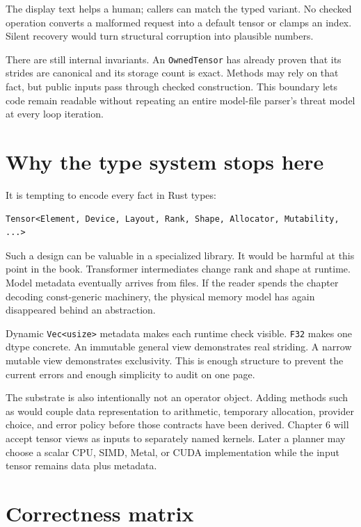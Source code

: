 The display text helps a human; callers can match the typed variant. No
checked operation converts a malformed request into a default tensor or
clamps an index. Silent recovery would turn structural corruption into
plausible numbers.

There are still internal invariants. An \texttt{OwnedTensor} has already
proven that its strides are canonical and its storage count is exact.
Methods may rely on that fact, but public inputs pass through checked
construction. This boundary lets code remain readable without repeating
an entire model-file parser's threat model at every loop iteration.

\section{Why the type system stops
here}\label{why-the-type-system-stops-here}

It is tempting to encode every fact in Rust types:

\begin{verbatim}
Tensor<Element, Device, Layout, Rank, Shape, Allocator, Mutability, ...>
\end{verbatim}

Such a design can be valuable in a specialized library. It would be
harmful at this point in the book. Transformer intermediates change rank
and shape at runtime. Model metadata eventually arrives from files. If
the reader spends the chapter decoding const-generic machinery, the
physical memory model has again disappeared behind an abstraction.

Dynamic \texttt{Vec\textless{}usize\textgreater{}} metadata makes each
runtime check visible. \texttt{F32} makes one dtype concrete. An
immutable general view demonstrates real striding. A narrow mutable view
demonstrates exclusivity. This is enough structure to prevent the
current errors and enough simplicity to audit on one page.

The substrate is also intentionally not an operator object. Adding
methods such as \texttt{} would couple
data representation to arithmetic, temporary allocation, provider
choice, and error policy before those contracts have been derived.
Chapter 6 will accept tensor views as inputs to separately named
kernels. Later a planner may choose a scalar CPU, SIMD, Metal, or CUDA
implementation while the input tensor remains data plus metadata.

\section{Correctness matrix}\label{correctness-matrix}

